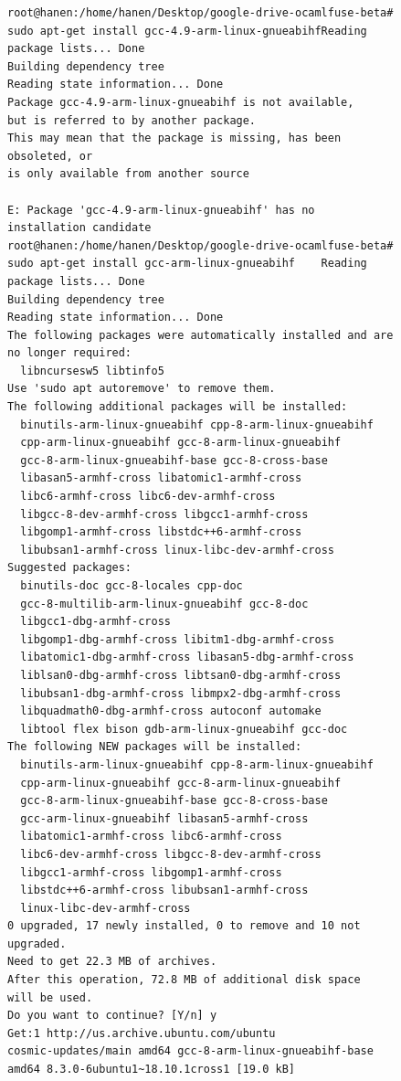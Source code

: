 \begin{verbatim}
root@hanen:/home/hanen/Desktop/google-drive-ocamlfuse-beta# 
sudo apt-get install gcc-4.9-arm-linux-gnueabihfReading 
package lists... Done
Building dependency tree       
Reading state information... Done
Package gcc-4.9-arm-linux-gnueabihf is not available, 
but is referred to by another package.
This may mean that the package is missing, has been 
obsoleted, or
is only available from another source

E: Package 'gcc-4.9-arm-linux-gnueabihf' has no 
installation candidate
root@hanen:/home/hanen/Desktop/google-drive-ocamlfuse-beta# 
sudo apt-get install gcc-arm-linux-gnueabihf    Reading 
package lists... Done
Building dependency tree       
Reading state information... Done
The following packages were automatically installed and are 
no longer required:
  libncursesw5 libtinfo5
Use 'sudo apt autoremove' to remove them.
The following additional packages will be installed:
  binutils-arm-linux-gnueabihf cpp-8-arm-linux-gnueabihf 
  cpp-arm-linux-gnueabihf gcc-8-arm-linux-gnueabihf
  gcc-8-arm-linux-gnueabihf-base gcc-8-cross-base 
  libasan5-armhf-cross libatomic1-armhf-cross
  libc6-armhf-cross libc6-dev-armhf-cross 
  libgcc-8-dev-armhf-cross libgcc1-armhf-cross
  libgomp1-armhf-cross libstdc++6-armhf-cross 
  libubsan1-armhf-cross linux-libc-dev-armhf-cross
Suggested packages:
  binutils-doc gcc-8-locales cpp-doc 
  gcc-8-multilib-arm-linux-gnueabihf gcc-8-doc 
  libgcc1-dbg-armhf-cross
  libgomp1-dbg-armhf-cross libitm1-dbg-armhf-cross 
  libatomic1-dbg-armhf-cross libasan5-dbg-armhf-cross
  liblsan0-dbg-armhf-cross libtsan0-dbg-armhf-cross 
  libubsan1-dbg-armhf-cross libmpx2-dbg-armhf-cross
  libquadmath0-dbg-armhf-cross autoconf automake 
  libtool flex bison gdb-arm-linux-gnueabihf gcc-doc
The following NEW packages will be installed:
  binutils-arm-linux-gnueabihf cpp-8-arm-linux-gnueabihf 
  cpp-arm-linux-gnueabihf gcc-8-arm-linux-gnueabihf
  gcc-8-arm-linux-gnueabihf-base gcc-8-cross-base 
  gcc-arm-linux-gnueabihf libasan5-armhf-cross
  libatomic1-armhf-cross libc6-armhf-cross 
  libc6-dev-armhf-cross libgcc-8-dev-armhf-cross
  libgcc1-armhf-cross libgomp1-armhf-cross 
  libstdc++6-armhf-cross libubsan1-armhf-cross
  linux-libc-dev-armhf-cross
0 upgraded, 17 newly installed, 0 to remove and 10 not 
upgraded.
Need to get 22.3 MB of archives.
After this operation, 72.8 MB of additional disk space 
will be used.
Do you want to continue? [Y/n] y
Get:1 http://us.archive.ubuntu.com/ubuntu 
cosmic-updates/main amd64 gcc-8-arm-linux-gnueabihf-base 
amd64 8.3.0-6ubuntu1~18.10.1cross1 [19.0 kB]

\end{verbatim}
